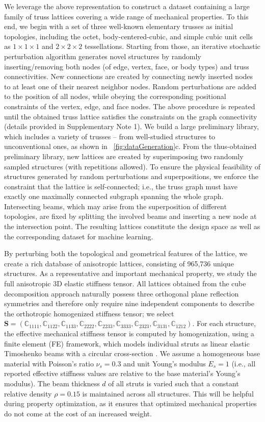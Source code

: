 \documentclass[fleqn,10pt]{wlscirep}
\newcommand{\dsC}{\mathbb{C}}
\begin{document}
We leverage the above representation to construct a dataset containing a large family of truss lattices covering a wide range of mechanical properties. To this end, we begin with a set of three well-known elementary trusses as initial topologies, including the octet, body-centered-cubic, and simple cubic unit cells as $1 \times 1 \times 1$ and $2 \times 2 \times 2$ tessellations. Starting from those, an iterative stochastic perturbation algorithm generates novel structures by randomly inserting/removing both nodes (of edge, vertex, face, or body types) and truss connectivities. New connections are created by connecting newly inserted nodes to at least one of their nearest neighbor nodes. Random perturbations are added to the position of all nodes, while obeying the corresponding positional constraints of the vertex, edge, and face nodes. The above procedure is repeated until the obtained truss lattice satisfies the constraints on the graph connectivity (details provided in Supplementary Note 1). We build a large preliminary library, which includes a variety of trusses -- from well-studied structures to unconventional ones, as shown in \figureautorefname~\ref{fig:dataGeneration}c. From the thus-obtained preliminary library, new lattices are created by superimposing two randomly sampled structures (with repetitions allowed). To ensure the physical feasibility of structures generated by random perturbations and superpositions, we enforce the constraint that the lattice is self-connected; i.e., the truss graph must have exactly one maximally connected subgraph spanning the whole graph.  Intersecting beams, which may arise from the superposition of different topologies, are fixed by splitting the involved beams and inserting a new node at the intersection point. The resulting lattices constitute the design space as well as the corresponding dataset for machine learning.

By perturbing both the topological and geometrical features of the lattice, we create a rich database of anisotropic lattices, consisting of 965{,}736 unique structures. As a representative and important mechanical property, we study the full anisotropic 3D elastic stiffness tensor. All lattices obtained from the cube decomposition approach naturally possess three orthogonal plane reflection symmetries and therefore only require nine independent components to describe the orthotropic homogenized stiffness tensor; we select $\boldsymbol{S} = (\dsC_{1111}, \dsC_{1122}, \dsC_{1133}, \dsC_{2222}, \dsC_{2233}, \dsC_{3333}, \dsC_{2323}, \dsC_{3131}, \dsC_{1212} )$. For each structure, the effective mechanical stiffness tensor is computed by homogenization, using a finite element (FE) framework, which models individual struts as linear elastic Timoshenko beams with a circular cross-section \cite{glaesener2020continuum}. We assume a homogeneous base material with Poisson's ratio $\nu_s = 0.3$ and unit Young's modulus $E_s=1$ (i.e., all reported effective stiffness values are relative to the base material's Young's modulus). The beam thickness $d$ of all struts is varied such that a constant relative density $\rho = 0.15$ is maintained across all structures. This will be helpful during property optimization, as it ensures that optimized mechanical properties do not come at the cost of an increased weight.
\end{document}
